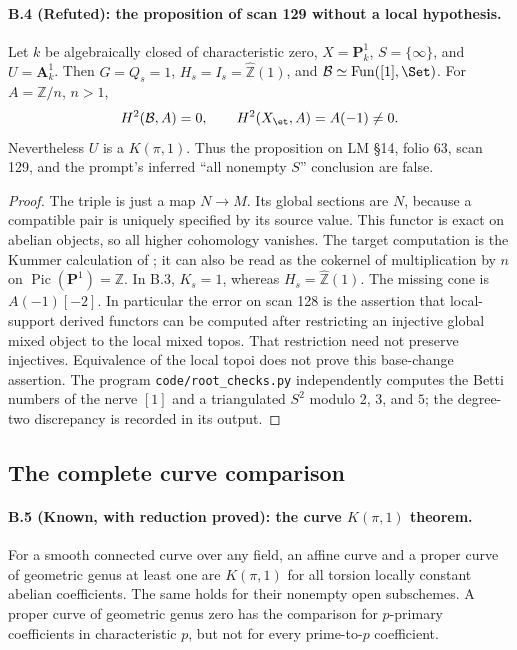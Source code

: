 \paragraph{B.4 (Refuted): the proposition of scan 129 without a local hypothesis.}\label{B4}
Let $k$ be algebraically closed of characteristic zero,
$X=\mathbf P^1_k$, $S=\{\infty\}$, and $U=\mathbf A^1_k$.
Then $G=Q_s=1$, $H_s=I_s=\widehat{\mathbb Z}(1)$, and
$\mathcal B\simeq\operatorname{Fun}([1],\Set)$. For
$A=\mathbb Z/n$, $n>1$,
\[
 H^2(\mathcal B,A)=0,\qquad
 H^2(X_{\et},A)=A(-1)\ne0.
\]
Nevertheless $U$ is a $K(\pi,1)$. Thus the proposition on LM \S14,
folio 63, scan 129, and the prompt's inferred ``all nonempty $S$''
conclusion are false.

\begin{proof}
The triple is just a map $N\to M$. Its global sections are $N$,
because a compatible pair is uniquely specified by its source value.
This functor is exact on abelian objects, so all higher cohomology
vanishes. The target computation is the Kummer calculation of
\citep[Tag 03RQ, Lemma 59.69.1]{StacksCurves}; it can also be read
as the cokernel of multiplication by $n$ on
$\operatorname{Pic}(\mathbf P^1)=\mathbb Z$.
In B.3, $K_s=1$, whereas $H_s=\widehat{\mathbb Z}(1)$.
The missing cone is $A(-1)[-2]$. In particular the error on scan 128
is the assertion that local-support derived functors can be computed
after restricting an injective global mixed object to the local mixed
topos. That restriction need not preserve injectives. Equivalence of
the local topoi does not prove this base-change assertion.
The program \texttt{code/root\_checks.py} independently computes the
Betti numbers of the nerve $[1]$ and a triangulated $S^2$ modulo
$2$, $3$, and $5$; the degree-two discrepancy is recorded in its output.
\end{proof}

\subsection{The complete curve comparison}

\paragraph{B.5 (Known, with reduction proved): the curve $K(\pi,1)$ theorem.}\label{B5}
For a smooth connected curve over any field, an affine curve and a
proper curve of geometric genus at least one are $K(\pi,1)$ for all
torsion locally constant abelian coefficients. The same holds for
their nonempty open subschemes. A proper curve of geometric genus
zero has the comparison for $p$-primary coefficients in
characteristic $p$, but not for every prime-to-$p$ coefficient.

